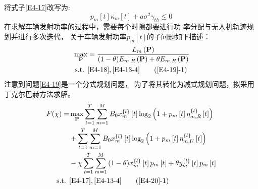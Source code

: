 将式子\eqref{E4-17}改写为: %
\begin{equation} \label{E4-18}
{{p}_{m}}\left[ t \right]{{\kappa }_{m}}\left[ t \right]+a{{\sigma }^{2}}{{\gamma }_{th}}\le 0
\end{equation}
在求解车辆发射功率的过程中，需要每个时隙都要进行功
率分配与无人机轨迹规划并进行多次迭代，
关于车辆发射功率$p_m\left[t\right]$的子问题如下描述：
\begin{align}  \label{E4-19}
\max _{ \mathbf{P}} &   ={\frac{{{L}_{m}}\left( \mathbf{P} \right)}
{(1-\theta){E}_{m,R}\left( \mathbf{P} \right)+\theta{E}_{m,R}\left( \mathbf{P} \right)}}        \\
\text { s.t. }
& \eqref{E4-18},\eqref{E4-13-4}                                                  \tag{\ref{E4-19}{-1}}      \label{E4-19-1}
\end{align}
注意到问题\eqref{E4-19}是一个分式规划问题，
为了将其转化为减式规划问题，拟采用丁克尔巴赫方法求解。
\begin{align} \notag
F(\chi)= & \max _{ \mathbf{P}} \sum_{t=1}^T \sum_{m=1}^M {B}_{0}x_{m}^{\left\{ l \right\}}\left[ t \right] %
\log_2{\left(1+p_m\left[t\right]\eta_{m,R}^{\left\{ l \right\}}\left[t\right]\right)}                         \\       \label{E4-20}
& + \sum_{t=1}^T \sum_{m=1}^M {B}_{0}x_{m}^{\left\{ l \right\}}\left[ t \right]
\log_2{\left(1+p_m\left[t\right]\eta_{m,U}^{\left\{ l \right\}}\left[t\right]\right)}                         \\ \notag
& -\chi \sum_{t=1}^T \sum_{m=1}^M{(1-\theta)x_{m}^{\left\{ l \right\}}\left[ t \right]p_m\left[t\right]
+\theta y_{m}^{\left\{ l \right\}}\left[ t \right]p_m\left[t\right]}                                          \\ \notag
\text { s.t. }
& \eqref{E4-17},\eqref{E4-13-4}                                                           \tag{\ref{E4-20}{-1}}       \label{E4-20-1}
\end{align}
